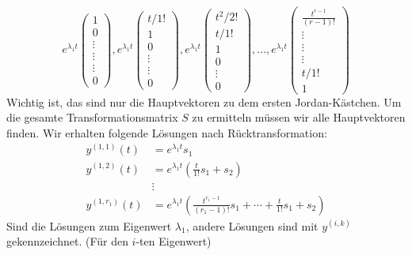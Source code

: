 \documentclass[a4paper]{article}
\begin{document}
\begin{enumerate}
\begin{enumerate}
				\[
				e ^{\lambda_1 t}
				\begin{pmatrix} 
					1 \\
					0 \\
					\vdots \\
					\vdots \\
					\vdots \\
					0
				\end{pmatrix},
				e ^{\lambda_1 t}
				\begin{pmatrix} 
					t / 1! \\
					1 \\
					0 \\
					\vdots \\
					\vdots \\
					0
				\end{pmatrix},
				e ^{\lambda_1 t}
				\begin{pmatrix} 
					t ^2 / 2! \\
					t / 1! \\
					1 \\
					0 \\
					\vdots \\
					0
				\end{pmatrix},
				... ,
				e ^{\lambda_1 t}
				\begin{pmatrix} 
					\frac{ t ^{r-1} }{ (r-1)! } \\
					\vdots \\
					\vdots \\
					\vdots \\
					t / 1! \\
					1
				\end{pmatrix}
				\] 
				Wichtig ist, das sind nur die Hauptvektoren zu dem ersten
				Jordan-Kästchen. Um die gesamte Transformationsmatrix $S$
				zu ermitteln müssen wir alle Hauptvektoren finden.
				Wir erhalten folgende Lösungen nach Rücktransformation:
				\begin{align*}
					y^{(1, 1)} (t)
					&= e ^{\lambda_1 t} s_1 \\
					y^{(1, 2)} (t)
					&= e ^{\lambda_1 t} \left(
						\frac{ t }{ 1! } s_1 + s_2
					\right)  \\
					& \vdots \\
					y^{(1, r_1)} (t)
					&= e ^{\lambda_1 t} \left(
						\frac{ t ^{r_1 - 1} }{ (r_1 - 1) ! } s_1 +
						\cdots +
						\frac{ t }{ 1! } s_1 + s_2
					\right) 
				\end{align*}
				Sind die Lösungen zum Eigenwert $\lambda_1$, andere
				Lösungen sind mit $y ^{(i, k)}$ gekennzeichnet.
				(Für den $i$-ten Eigenwert)
		\end{enumerate}
\end{enumerate}
\end{document}
